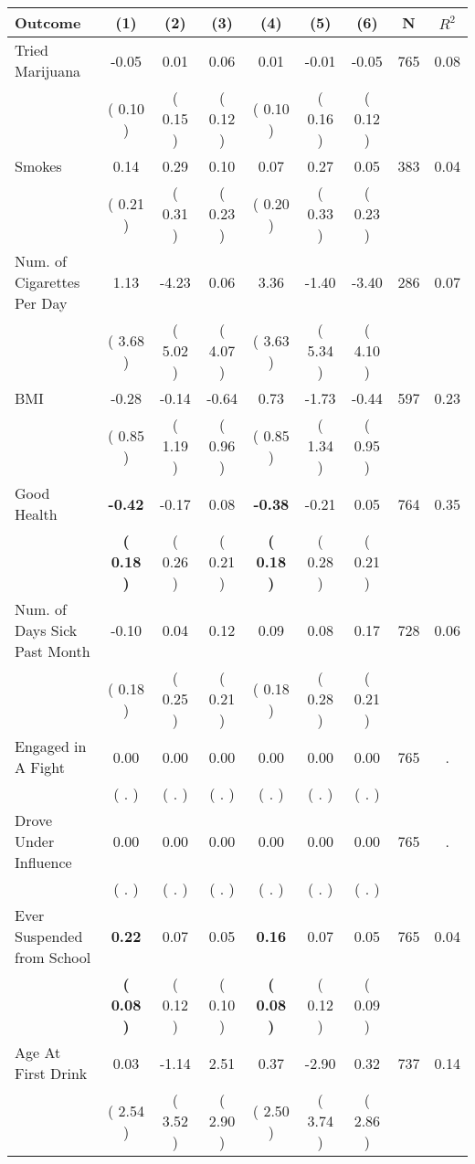 \begin{tabular}{lcccccccc}
\toprule
 \textbf{Outcome} & \textbf{(1)} & \textbf{(2)} & \textbf{(3)} & \textbf{(4)} & \textbf{(5)} & \textbf{(6)} & \textbf{N} & \textbf{$ R^2$} \\
\midrule
Tried Marijuana &     -0.05 &      0.01 &      0.06 &      0.01 &     -0.01 &     -0.05 & 765 &       0.08 \\ 
 & (     0.10 ) & (     0.15 ) & (     0.12 ) & (     0.10 ) & (     0.16 ) & (     0.12 ) & \\
Smokes &      0.14 &      0.29 &      0.10 &      0.07 &      0.27 &      0.05 & 383 &       0.04 \\ 
 & (     0.21 ) & (     0.31 ) & (     0.23 ) & (     0.20 ) & (     0.33 ) & (     0.23 ) & \\
Num. of Cigarettes Per Day &      1.13 &     -4.23 &      0.06 &      3.36 &     -1.40 &     -3.40 & 286 &       0.07 \\ 
 & (     3.68 ) & (     5.02 ) & (     4.07 ) & (     3.63 ) & (     5.34 ) & (     4.10 ) & \\
BMI &     -0.28 &     -0.14 &     -0.64 &      0.73 &     -1.73 &     -0.44 & 597 &       0.23 \\ 
 & (     0.85 ) & (     1.19 ) & (     0.96 ) & (     0.85 ) & (     1.34 ) & (     0.95 ) & \\
Good Health & \textbf{    -0.42} &     -0.17 &      0.08 & \textbf{    -0.38} &     -0.21 &      0.05 & 764 &       0.35 \\ 
 & \textbf{(     0.18 )} & (     0.26 ) & (     0.21 ) & \textbf{(     0.18 )} & (     0.28 ) & (     0.21 ) & \\
Num. of Days Sick Past Month &     -0.10 &      0.04 &      0.12 &      0.09 &      0.08 &      0.17 & 728 &       0.06 \\ 
 & (     0.18 ) & (     0.25 ) & (     0.21 ) & (     0.18 ) & (     0.28 ) & (     0.21 ) & \\
Engaged in A Fight &      0.00 &      0.00 &      0.00 &      0.00 &      0.00 &      0.00 & 765 &          . \\ 
 & (        . ) & (        . ) & (        . ) & (        . ) & (        . ) & (        . ) & \\
Drove Under Influence &      0.00 &      0.00 &      0.00 &      0.00 &      0.00 &      0.00 & 765 &          . \\ 
 & (        . ) & (        . ) & (        . ) & (        . ) & (        . ) & (        . ) & \\
Ever Suspended from School & \textbf{     0.22} &      0.07 &      0.05 & \textbf{     0.16} &      0.07 &      0.05 & 765 &       0.04 \\ 
 & \textbf{(     0.08 )} & (     0.12 ) & (     0.10 ) & \textbf{(     0.08 )} & (     0.12 ) & (     0.09 ) & \\
Age At First Drink &      0.03 &     -1.14 &      2.51 &      0.37 &     -2.90 &      0.32 & 737 &       0.14 \\ 
 & (     2.54 ) & (     3.52 ) & (     2.90 ) & (     2.50 ) & (     3.74 ) & (     2.86 ) & \\
\bottomrule
\end{tabular}
